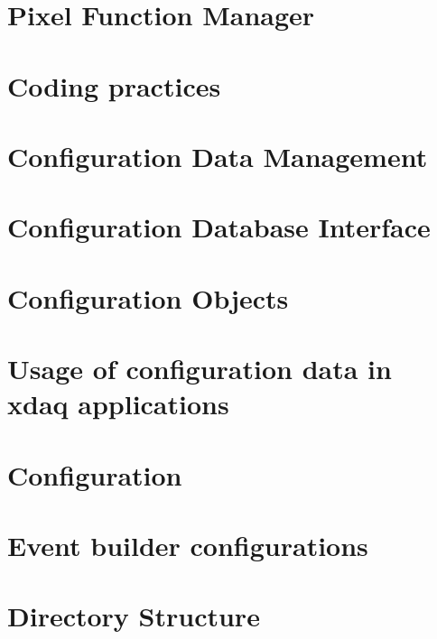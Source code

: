 \documentclass[12pt]{article}
\begin{document}
\section{Pixel Function Manager}
\label{sec:l1fm}


\section{Coding practices}
\label{sec:CodingPractices}


\section{Configuration Data Management}
\label{sec:ConfigurationDataManagement}


\section{Configuration Database Interface}
\label{sec:ConfigurationDatabaseInterface}


\section{Configuration Objects}
\label{sect:configobjects}


\section{Usage of configuration data in xdaq applications}
\label{sec:ConfigurationDataUsage}


\section{Configuration}
\label{sec:configuration}


\section{Event builder configurations}
\label{sec:EventBuilderConfigurations}


\section{Directory Structure}
\label{directorystructure}

\end{document}
